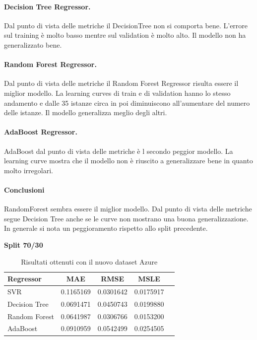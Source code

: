 \paragraph{\textbf{Decision Tree Regressor}.}
Dal punto di vista delle metriche il DecisionTree non si comporta bene. L'errore sul training è molto basso mentre sul validation è molto alto. Il modello non ha generalizzato bene.
\paragraph{\textbf{Random Forest Regressor}.}
Dal punto di vista delle metriche il Random Forest Regressor risulta essere il miglior modello.
La learning curves di train e di validation hanno lo stesso andamento e dalle 35 istanze circa in poi diminuiscono all'aumentare del numero delle istanze. Il modello generalizza meglio degli altri.
\paragraph{\textbf{AdaBoost Regressor}.}
AdaBoost dal punto di vista delle metriche è l secondo peggior modello. La learning curve mostra che il modello non è riuscito a generalizzare bene in quanto molto irregolari.

\paragraph{\textbf{Conclusioni}} RandomForest sembra essere il miglior modello. Dal punto di vista delle metriche segue Decision Tree anche se le curve non mostrano una buona generalizzazione. In generale si nota un peggioramento rispetto allo split precedente.
\newpage


\noindent\textbf{Split 70/30}

\begin{table}[H]
    \centering
    \begin{tabular}{|>{\centering\arraybackslash}m{5cm}|c|c|c|c|}
        \hline
        \textbf{Regressor} & \textbf{MAE} & \textbf{RMSE} & \textbf{MSLE} \\ [10pt]
        \hline
        SVR & 0.1165169 & 0.0301642 & 0.0175917 \\ [10pt]
        \hline
        Decision Tree & 0.0691471 & 0.0450743 & 0.0199880 \\ [10pt]
        \hline
        Random Forest & 0.0641987 & 0.0306766 & 0.0153200 \\ [10pt]
        \hline
        AdaBoost & 0.0910959 & 0.0542499 & 0.0254505 \\ [10pt]
        \hline
    \end{tabular}
    \caption{Risultati ottenuti con il nuovo dataset Azure}
    \label{tab:results}
\end{table}

